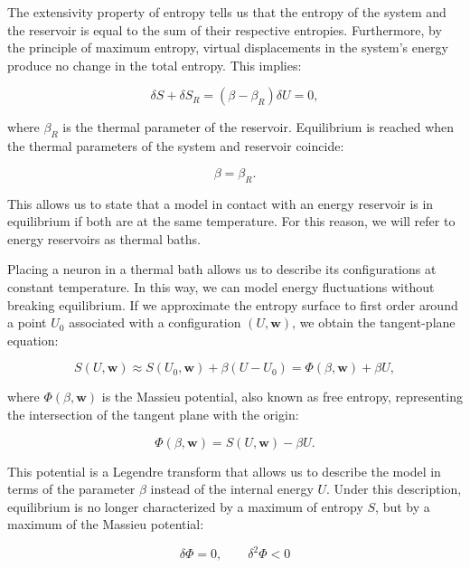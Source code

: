 \documentclass[12pt]{article}
\begin{document}
The extensivity property of entropy tells us that the entropy of the system and the reservoir is equal to the sum of their respective entropies. Furthermore, by the principle of maximum entropy, virtual displacements in the system’s energy produce no change in the total entropy. This implies:

\begin{equation}
\delta S + \delta S_R = (\beta-\beta_R) \delta U = 0,
\end{equation}

where $\beta_R$ is the thermal parameter of the reservoir. Equilibrium is reached when the thermal parameters of the system and reservoir coincide:

\begin{equation}
\beta = \beta_R.
\end{equation}

This allows us to state that a model in contact with an energy reservoir is in equilibrium if both are at the same temperature. For this reason, we will refer to energy reservoirs as thermal baths.

Placing a neuron in a thermal bath allows us to describe its configurations at constant temperature. In this way, we can model energy fluctuations without breaking equilibrium. If we approximate the entropy surface to first order around a point $U_0$ associated with a configuration $(U, \mathbf{w})$, we obtain the tangent-plane equation:

\begin{equation}
S(U, \mathbf{w}) \approx S(U_0,\mathbf{w}) + \beta(U-U_0) = \Phi(\beta, \mathbf{w}) + \beta U,
\end{equation}

where $\Phi(\beta, \mathbf{w})$ is the Massieu potential, also known as free entropy, representing the intersection of the tangent plane with the origin:

\begin{equation}
\Phi(\beta, \mathbf{w}) = S(U,\mathbf{w}) - \beta U.
\end{equation}
  
This potential is a Legendre transform that allows us to describe the model in terms of the parameter $\beta$ instead of the internal energy $U$. Under this description, equilibrium is no longer characterized by a maximum of entropy $S$, but by a maximum of the Massieu potential:

\begin{equation}
\delta \Phi = 0, \qquad \delta^2 \Phi < 0
\end{equation}
\end{document}
